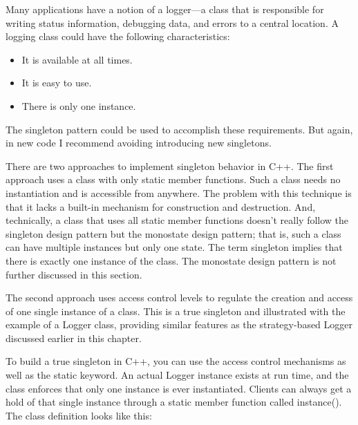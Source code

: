 
Many applications have a notion of a logger—a class that is responsible for writing status information, debugging data, and errors to a central location. A logging class could have the following characteristics:

\begin{itemize}
\item
It is available at all times.

\item
It is easy to use.

\item
There is only one instance.
\end{itemize}

The singleton pattern could be used to accomplish these requirements. But again, in new code I recommend avoiding introducing new singletons.


There are two approaches to implement singleton behavior in C++. The first approach uses a class with only static member functions. Such a class needs no instantiation and is accessible from anywhere. The problem with this technique is that it lacks a built-in mechanism for construction and destruction. And, technically, a class that uses all static member functions doesn’t really follow the singleton design pattern but the monostate design pattern; that is, such a class can have multiple instances but only one state. The term singleton implies that there is exactly one instance of the class. The monostate design pattern is not further discussed in this section.

The second approach uses access control levels to regulate the creation and access of one single instance of a class. This is a true singleton and illustrated with the example of a Logger class, providing similar features as the strategy-based Logger discussed earlier in this chapter.

To build a true singleton in C++, you can use the access control mechanisms as well as the static keyword. An actual Logger instance exists at run time, and the class enforces that only one instance is ever instantiated. Clients can always get a hold of that single instance through a static member function called instance(). The class definition looks like this:

